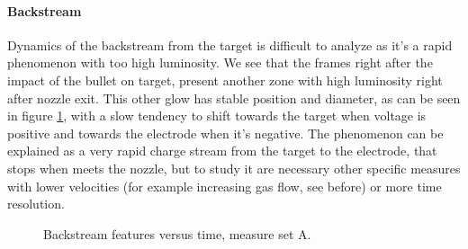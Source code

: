 \paragraph{Backstream}
Dynamics of the backstream from the target is difficult to analyze as it's a rapid phenomenon with too high luminosity. We see that the frames right after the impact of the bullet on target, present another zone with high luminosity right after nozzle exit. This other glow has stable position and diameter, as can be seen in figure \ref{fig:elio_a_back}, with a slow tendency to shift towards the target when voltage is positive and towards the electrode when it's negative.
The phenomenon can be explained as a very rapid charge stream from the target to the electrode, that stops when meets the nozzle, but to study it are necessary other specific measures with lower velocities (for example increasing gas flow, see before) or more time resolution.
\begin{figure}
 \centering
 \hfill
 
 \hfill
 \caption{Backstream features versus time, measure set A.}
 \label{fig:elio_a_back}
\end{figure}


